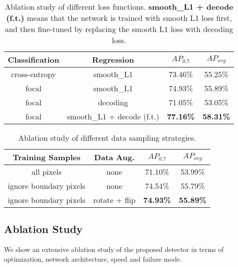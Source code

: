 \begin{table}[t]
\begin{center}
\begin{small}
\begin{tabular}{|c|c|cc|}
\hline
Classification & Regression & $AP_{0.7}$ & $AP_{avg}$ \\
\hline
cross-entropy & smooth\_L1 & 73.46\% & 55.25\%\\
focal & smooth\_L1 & 74.93\% & 55.89\% \\
focal & decoding & 71.05\% & 53.05\% \\
focal & smooth\_L1 + decode (f.t.) & {\bf 77.16\%} & {\bf 58.31\%} \\
\hline
\end{tabular}
\caption{Ablation study of different loss functions. {\bf smooth\_L1 + decode (f.t.)} means that the network is trained with smooth L1 loss first, and then fine-tuned by replacing the smooth L1 loss with decoding loss.}
\label{tab:loss}
\end{small}
\end{center}
\vspace{-0.3cm}

\end{table}
\begin{table}[t]
\begin{center}
\begin{small}
\begin{tabular}{|c|c|cc|}
\hline
Training Samples & Data Aug. & $AP_{0.7}$ & $AP_{avg}$ \\
\hline
all pixels & none & 71.10\% & 53.99\% \\
ignore boundary pixels & none & 74.54\% & 55.79\% \\
ignore boundary pixels & rotate + flip & {\bf 74.93\%} & {\bf 55.89\%} \\
\hline
\end{tabular}
\caption{Ablation study of different data sampling strategies.}
\label{tab:sample}
\end{small}
\end{center}
\vspace{-0.5cm}
\end{table}


\subsection{Ablation Study}

We show an extensive ablation study of the proposed detector in terms of optimization, network architecture, speed and failure mode.

